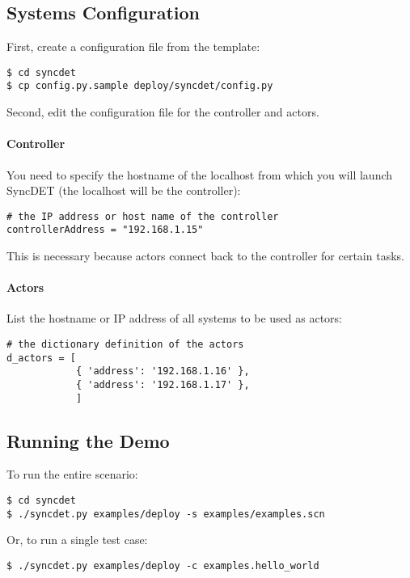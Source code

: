 \subsection{Systems Configuration}
First, create a configuration file from the template:
\begin{verbatim}
$ cd syncdet
$ cp config.py.sample deploy/syncdet/config.py
\end{verbatim}

Second, edit the configuration file for the controller and actors. 

\paragraph{Controller} 
You need to specify the hostname of the localhost from which you will launch
SyncDET (the localhost will be the controller):
\begin{verbatim}
# the IP address or host name of the controller
controllerAddress = "192.168.1.15"
\end{verbatim}
This is necessary because actors connect back to the controller for certain tasks.

\paragraph{Actors} 
List the hostname or IP address of all systems to be used as actors:
\begin{verbatim}
# the dictionary definition of the actors
d_actors = [
            { 'address': '192.168.1.16' },
            { 'address': '192.168.1.17' },
            ]
\end{verbatim}

\subsection{Running the Demo}

To run the entire scenario:
\begin{verbatim}
$ cd syncdet
$ ./syncdet.py examples/deploy -s examples/examples.scn
\end{verbatim}

Or, to run a single test case:
\begin{verbatim}
$ ./syncdet.py examples/deploy -c examples.hello_world
\end{verbatim}
